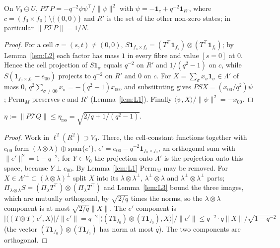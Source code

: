 \begin{lemma}[L4]\label{lem:L4}
On $V_0\ominus U$, $P\mathcal TP=-q^{-2}\psi\psi^\top/\|\psi\|^2$ with $\psi=-\mathbf 1_c+q^{-2}\mathbf 1_{R'}$, where $c=(f_0\times f_0)\setminus\{(0,0)\}$ and
$R'$ is the set of the other non-zero states; in particular $\|P\mathcal TP\|=1/N$.
\end{lemma}
\begin{proof}
For a cell $\sigma=(s,t)\ne(0,0)$, $S\mathbf 1_{f_s\times f_t}=(T^\top\mathbf 1_{f_s})\otimes(T^\top\mathbf 1_{f_t})$; by Lemma~\ref{lem:L2} each factor has mass $1$ in every
fibre and value $[s=0]$ at $0$. Hence the cell projection of $S\mathbf1_\sigma$ equals $q^{-2}$ on $R'$ and $1/(q^2-1)$ on $c$, while
$S(\mathbf 1_{f_0\times f_0}-e_{00})$ projects to $q^{-2}$ on $R'$ and $0$ on $c$. For $X=\sum_\sigma x_\sigma\mathbf 1_\sigma\in\Lambda'$ of mass $0$,
$q^2\sum_{\sigma\ne00}x_\sigma=-(q^2-1)x_{00}$, and substituting gives $P SX=(x_{00}/q^2)\psi$; $\mathrm{Perm}_M$ preserves $c$ and $R'$ (Lemma~\ref{lem:L1}). Finally
$\langle\psi,X\rangle/\|\psi\|^2=-x_{00}$.
\end{proof}

\begin{lemma}[L5]\label{lem:L5}
$\eta:=\|P\mathcal TQ\|\le\eta_{\mathrm{rss}}=\sqrt{2/q+1/(q^2-1)}$.
\end{lemma}
\begin{proof}
Work in $\ell^2(R^2)\supset V_0$. There, the cell-constant functions together with $e_{00}$ form $(\lambda\otimes\lambda)\oplus\mathrm{span}\{e'\}$,
$e'=e_{00}-q^{-2}\mathbf 1_{f_0\times f_0}$, an orthogonal sum with $\|e'\|^2=1-q^{-2}$; for $Y\in V_0$ the projection onto $\Lambda'$ is the projection onto this
space, because $Y\perp e_{00}$. By Lemma~\ref{lem:L1} $\mathrm{Perm}_M$ may be removed. For $X\in\Lambda'^\perp\subset(\lambda\otimes\lambda)^\perp$ split $X$ into its $\lambda\otimes\lambda^\perp$, $\lambda^\perp\otimes\lambda$ and
$\lambda^\perp\otimes\lambda^\perp$ parts; $\Pi_{\lambda\otimes\lambda}S=(\Pi_\lambda T^\top)\otimes(\Pi_\lambda T^\top)$ and Lemma~\ref{lem:L3} bound the three images, which are mutually
orthogonal, by $\sqrt{2/q}$ times the norms, so the $\lambda\otimes\lambda$ component is at most $\sqrt{2/q}\|X\|$. The $e'$ component is
$|\langle(T\otimes T)e',X\rangle|/\|e'\|=q^{-2}|\langle(T\mathbf1_{f_0})\otimes(T\mathbf1_{f_0}),X\rangle|/\|e'\|\le q^{-2}\cdot q\|X\|/\sqrt{1-q^{-2}}$ (the vector
$(T\mathbf 1_{f_0})\otimes(T\mathbf1_{f_0})$ has norm at most $q$). The two components are orthogonal.
\end{proof}


